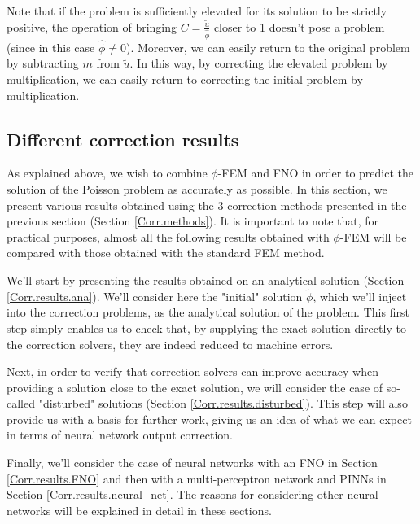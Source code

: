\begin{Rem}
	Note that if the problem is sufficiently elevated for its solution to be strictly positive, the operation of bringing $C=\frac{\tilde{u}}{\hat{\phi}}$ closer to 1 doesn't pose a problem (since in this case $\hat{\phi}\ne 0$). Moreover, we can easily return to the original problem by subtracting $m$ from $\tilde{u}$. In this way, by correcting the elevated problem by multiplication, we can easily return to correcting the initial problem by multiplication.  
\end{Rem}

\subsection{Different correction results}

As explained above, we wish to combine $\phi$-FEM and FNO in order to predict the solution of the Poisson problem as accurately as possible. In this section, we present various results obtained using the 3 correction methods presented in the previous section (Section \ref{Corr.methods}). It is important to note that, for practical purposes, almost all the following results obtained with $\phi$-FEM will be compared with those obtained with the standard FEM method.

We'll start by presenting the results obtained on an analytical solution (Section \ref{Corr.results.ana}). We'll consider here the "initial" solution $\tilde{\phi}$, which we'll inject into the correction problems, as the analytical solution of the problem. This first step simply enables us to check that, by supplying the exact solution directly to the correction solvers, they are indeed reduced to machine errors.

Next, in order to verify that correction solvers can improve accuracy when providing a solution close to the exact solution, we will consider the case of so-called "disturbed" solutions (Section \ref{Corr.results.disturbed}). This step will also provide us with a basis for further work, giving us an idea of what we can expect in terms of neural network output correction.

Finally, we'll consider the case of neural networks with an FNO in Section \ref{Corr.results.FNO} and then with a multi-perceptron network and PINNs in Section \ref{Corr.results.neural_net}. The reasons for considering other neural networks will be explained in detail in these sections.

